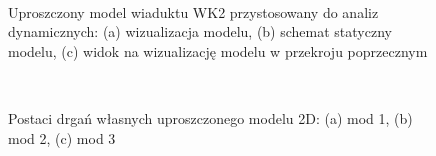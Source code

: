 \begin{figure}[hbt!]
	\centering
	\begin{minipage}{0.7\textwidth}
		\\
	\end{minipage}\qquad
	\begin{minipage}{0.15\textwidth}
	\end{minipage}
	\captionsetup{justification=centering}
	\caption{Uproszczony model wiaduktu WK2 przystosowany do analiz dynamicznych: (a) wizualizacja modelu, (b) schemat statyczny modelu, (c) widok na wizualizację modelu w przekroju poprzecznym}
	\label{fig:wk2_model_plaski}
\end{figure}



\begin{figure}[hbt!]
	\centering
	\\
	\captionsetup{justification=centering}
	\caption{Postaci drgań własnych uproszczonego modelu 2D: (a) mod 1, (b) mod 2, (c) mod 3}
	\label{fig:wk2_upr_mods}
\end{figure}


